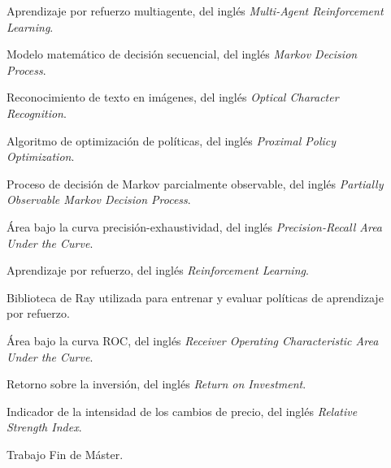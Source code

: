 \begin{description}
  \item[] Aprendizaje por refuerzo multiagente, del inglés \emph{Multi-Agent Reinforcement Learning}.
  \item[] Modelo matemático de decisión secuencial, del inglés \emph{Markov Decision Process}.
  \item[] Reconocimiento de texto en imágenes, del inglés \emph{Optical Character Recognition}.
  \item[] Algoritmo de optimización de políticas, del inglés \emph{Proximal Policy Optimization}.
  \item[] Proceso de decisión de Markov parcialmente observable, del inglés \emph{Partially Observable Markov Decision Process}.
  \item[] Área bajo la curva precisión-exhaustividad, del inglés \emph{Precision-Recall Area Under the Curve}.
  \item[] Aprendizaje por refuerzo, del inglés \emph{Reinforcement Learning}.
  \item[] Biblioteca de Ray utilizada para entrenar y evaluar políticas de aprendizaje por refuerzo.
  \item[] Área bajo la curva ROC, del inglés \emph{Receiver Operating Characteristic Area Under the Curve}.
  \item[] Retorno sobre la inversión, del inglés \emph{Return on Investment}.
  \item[] Indicador de la intensidad de los cambios de precio, del inglés \emph{Relative Strength Index}.
  \item[] Trabajo Fin de Máster.
\end{description}
\indicebottomrule
